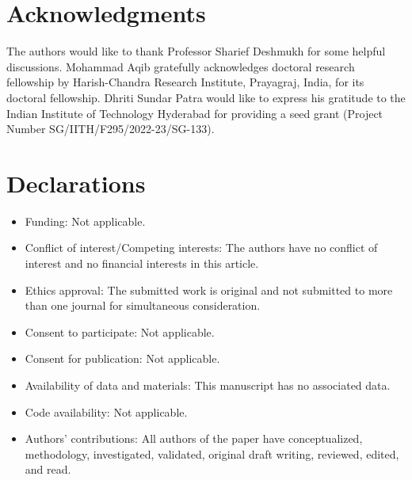 \documentclass[a4paper, twoside, 10pt]{article}
\numberwithin{equation}{section}
\theoremstyle{definition}
\begin{document}
 
 \section*{Acknowledgments} %
	The authors would like to thank
 Professor Sharief Deshmukh for some helpful
 discussions. Mohammad Aqib gratefully acknowledges doctoral research fellowship by Harish-Chandra Research Institute, Prayagraj, India, for its doctoral fellowship. Dhriti Sundar Patra would like to express his gratitude to the Indian Institute of Technology Hyderabad for providing a seed grant (Project Number SG/IITH/F295/2022-23/SG-133). 
	
	\section*{Declarations}
	
	\begin{itemize}
		\item Funding: Not applicable. 
		
		\item Conflict of interest/Competing interests: The authors have no conflict of interest and no financial interests in this article.
		
		\item Ethics approval: The submitted work is original and not submitted to more than one journal for simultaneous consideration.
		
		\item Consent to participate: Not applicable.
		
		\item Consent for publication: Not applicable.
		
		\item Availability of data and materials: This manuscript has no associated data.
		
		\item Code availability: Not applicable.
		
		\item Authors' contributions: All authors of the paper have conceptualized, methodology, investigated, validated, original draft writing, reviewed, edited, and read.
		
	\end{itemize}
 
	
	


\end{document}
